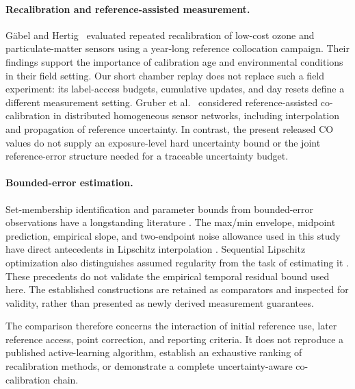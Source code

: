 \paragraph{Recalibration and reference-assisted measurement.}
G\"abel and Hertig~\cite{gaebel2026} evaluated repeated recalibration of low-cost ozone and particulate-matter sensors using a year-long reference collocation campaign. Their findings support the importance of calibration age and environmental conditions in their field setting. Our short chamber replay does not replace such a field experiment: its label-access budgets, cumulative updates, and day resets define a different measurement setting. Gruber et al.~\cite{gruber2023} considered reference-assisted co-calibration in distributed homogeneous sensor networks, including interpolation and propagation of reference uncertainty. In contrast, the present released CO values do not supply an exposure-level hard uncertainty bound or the joint reference-error structure needed for a traceable uncertainty budget.

\paragraph{Bounded-error estimation.}
Set-membership identification and parameter bounds from bounded-error observations have a longstanding literature \cite{walter1990}. The max/min envelope, midpoint prediction, empirical slope, and two-endpoint noise allowance used in this study have direct antecedents in Lipschitz interpolation \cite{calliess2017}. Sequential Lipschitz optimization also distinguishes assumed regularity from the task of estimating it \cite{malherbe2017}. These precedents do not validate the empirical temporal residual bound used here. The established constructions are retained as comparators and inspected for validity, rather than presented as newly derived measurement guarantees.

The comparison therefore concerns the interaction of initial reference use, later reference access, point correction, and reporting criteria. It does not reproduce a published active-learning algorithm, establish an exhaustive ranking of recalibration methods, or demonstrate a complete uncertainty-aware co-calibration chain.

